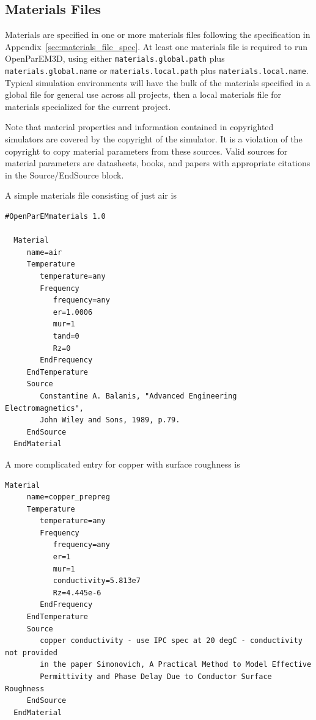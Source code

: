 \documentclass[titlepage]{article}
\renewcommand\_{\textunderscore\linebreak[1]}
\begin{document}
\subsection{Materials Files}

Materials are specified in one or more materials files following the specification in Appendix~\ref{sec:materials_file_spec}.  At least one materials file is required to run OpenParEM3D, using either \texttt{materials.global.path} plus \newline \texttt{materials.global.name} or \texttt{materials.local.path} plus \texttt{materials.local.name}.  Typical simulation environments will have the bulk of the materials specified in a global file for general use across all projects, then a local materials file for materials specialized for the current project.

Note that material properties and information contained in copyrighted simulators are covered by the copyright of the simulator.  It is a violation of the copyright to copy material parameters from these sources.  Valid sources for material parameters are datasheets, books, and papers with appropriate citations in the Source/EndSource block.

A simple materials file consisting of just air is
\begin{Verbatim}[fontsize=\small]
  #OpenParEMmaterials 1.0

  Material
     name=air
     Temperature
        temperature=any
        Frequency
           frequency=any
           er=1.0006
           mur=1
           tand=0
           Rz=0
        EndFrequency
     EndTemperature
     Source
        Constantine A. Balanis, "Advanced Engineering Electromagnetics",
        John Wiley and Sons, 1989, p.79.
     EndSource
  EndMaterial
\end{Verbatim}

\noindent A more complicated entry for copper with surface roughness is
\begin{Verbatim}[fontsize=\small]
  Material
     name=copper_prepreg
     Temperature
        temperature=any
        Frequency
           frequency=any
           er=1
           mur=1
           conductivity=5.813e7
           Rz=4.445e-6
        EndFrequency
     EndTemperature
     Source
        copper conductivity - use IPC spec at 20 degC - conductivity not provided
        in the paper Simonovich, A Practical Method to Model Effective 
        Permittivity and Phase Delay Due to Conductor Surface Roughness
     EndSource
  EndMaterial
\end{Verbatim}
\end{document}
